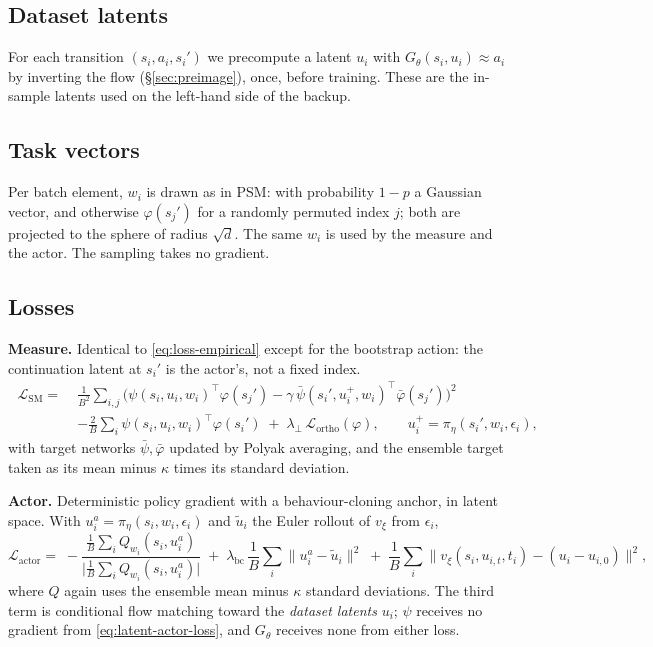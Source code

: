 \documentclass[11pt]{article}
\theoremstyle{plain}
\theoremstyle{definition}
\theoremstyle{remark}
\newcommand{\1}{\mathbf 1}
\newcommand{\Gth}{G_\theta}
\begin{document}
\subsection{Dataset latents}

For each transition $(s_i,a_i,s_i')$ we precompute a latent $u_i$ with
$\Gth(s_i,u_i)\approx a_i$ by inverting the flow (\S\ref{sec:preimage}), once, before
training. These are the in-sample latents used on the left-hand side of the backup.

\subsection{Task vectors}

Per batch element, $w_i$ is drawn as in PSM: with probability $1-p$ a Gaussian vector, and
otherwise $\varphi(s_j')$ for a randomly permuted index $j$; both are projected to the
sphere of radius $\sqrt{d}$. The same $w_i$ is used by the measure and the actor. The
sampling takes no gradient.

\subsection{Losses}

\textbf{Measure.} Identical to \eqref{eq:loss-empirical} except for the bootstrap action:
the continuation latent at $s_i'$ is the actor's, not a fixed index.
\begin{equation}
\label{eq:latent-sm-loss}
\boxed{\;
\begin{aligned}
  \mathcal L_{\mathrm{SM}}
  =\;&\frac{1}{B^2}\sum_{i,j}\Big(\psi(s_i,u_i,w_i)^\top\varphi(s_j')
      -\gamma\,\bar\psi(s_i',u_i^{+},w_i)^\top\bar\varphi(s_j')\Big)^2\\
   &-\frac{2}{B}\sum_i \psi(s_i,u_i,w_i)^\top\varphi(s_i')
   \;+\;\lambda_\perp\,\mathcal L_{\mathrm{ortho}}(\varphi),
  \qquad u_i^{+}=\pi_\eta(s_i',w_i,\epsilon_i),
\end{aligned}\;}
\end{equation}
with target networks $\bar\psi,\bar\varphi$ updated by Polyak averaging, and the ensemble
target taken as its mean minus $\kappa$ times its standard deviation.

\textbf{Actor.} Deterministic policy gradient with a behaviour-cloning anchor, in latent
space. With $u^a_i=\pi_\eta(s_i,w_i,\epsilon_i)$ and $\tilde u_i$ the Euler rollout of
$v_\xi$ from $\epsilon_i$,
\begin{equation}
\label{eq:latent-actor-loss}
  \mathcal L_{\mathrm{actor}}
  =\;-\frac{\frac1B\sum_i Q_{w_i}(s_i,u^a_i)}{\big|\frac1B\sum_i Q_{w_i}(s_i,u^a_i)\big|}
   \;+\;\lambda_{\mathrm{bc}}\,\frac1B\sum_i\|u^a_i-\tilde u_i\|^2
   \;+\;\frac1B\sum_i\big\|v_\xi(s_i,u_{i,t},t_i)-(u_i-u_{i,0})\big\|^2 ,
\end{equation}
where $Q$ again uses the ensemble mean minus $\kappa$ standard deviations. The third term
is conditional flow matching toward the \emph{dataset latents} $u_i$; $\psi$ receives no
gradient from \eqref{eq:latent-actor-loss}, and $\Gth$ receives none from either loss.
\end{document}
